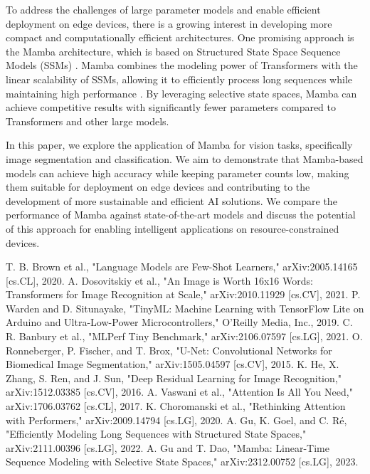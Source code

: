 \documentclass[conference]{IEEEtran}
\begin{document}
To address the challenges of large parameter models and enable efficient deployment on edge devices, there is a growing interest in developing more compact and computationally efficient architectures. One promising approach is the Mamba architecture, which is based on Structured State Space Sequence Models (SSMs) \cite{gu2022efficiently}. Mamba combines the modeling power of Transformers with the linear scalability of SSMs, allowing it to efficiently process long sequences while maintaining high performance \cite{gu2023mamba}. By leveraging selective state spaces, Mamba can achieve competitive results with significantly fewer parameters compared to Transformers and other large models.

In this paper, we explore the application of Mamba for vision tasks, specifically image segmentation and classification. We aim to demonstrate that Mamba-based models can achieve high accuracy while keeping parameter counts low, making them suitable for deployment on edge devices and contributing to the development of more sustainable and efficient AI solutions. We compare the performance of Mamba against state-of-the-art models and discuss the potential of this approach for enabling intelligent applications on resource-constrained devices.

\begin{thebibliography}{00}
    T. B. Brown et al., "Language Models are Few-Shot Learners," arXiv:2005.14165 [cs.CL], 2020.
    A. Dosovitskiy et al., "An Image is Worth 16x16 Words: Transformers for Image Recognition at Scale," arXiv:2010.11929 [cs.CV], 2021.
    P. Warden and D. Situnayake, "TinyML: Machine Learning with TensorFlow Lite on Arduino and Ultra-Low-Power Microcontrollers," O'Reilly Media, Inc., 2019.
    C. R. Banbury et al., "MLPerf Tiny Benchmark," arXiv:2106.07597 [cs.LG], 2021.
    O. Ronneberger, P. Fischer, and T. Brox, "U-Net: Convolutional Networks for Biomedical Image Segmentation," arXiv:1505.04597 [cs.CV], 2015.
    K. He, X. Zhang, S. Ren, and J. Sun, "Deep Residual Learning for Image Recognition," arXiv:1512.03385 [cs.CV], 2016.
    A. Vaswani et al., "Attention Is All You Need," arXiv:1706.03762 [cs.CL], 2017.
    K. Choromanski et al., "Rethinking Attention with Performers," arXiv:2009.14794 [cs.LG], 2020.
    A. Gu, K. Goel, and C. Ré, "Efficiently Modeling Long Sequences with Structured State Spaces," arXiv:2111.00396 [cs.LG], 2022.
    A. Gu and T. Dao, "Mamba: Linear-Time Sequence Modeling with Selective State Spaces," arXiv:2312.00752 [cs.LG], 2023.
\end{thebibliography}
\end{document}
